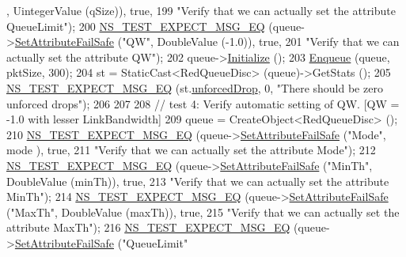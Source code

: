 \begin{DoxyCode}
      , UintegerValue (qSize)), \textcolor{keyword}{true},
199                          \textcolor{stringliteral}{"Verify that we can actually set the attribute QueueLimit"});
200   \hyperlink{group__testing_ga7304ba46a28d8cf08dfdfd6499cf7068}{NS\_TEST\_EXPECT\_MSG\_EQ} (queue->\hyperlink{classns3_1_1ObjectBase_aa7d333004e970f925a4ed5df275541b5}{SetAttributeFailSafe} (\textcolor{stringliteral}{"QW"}, 
      DoubleValue (-1.0)), \textcolor{keyword}{true},
201                          \textcolor{stringliteral}{"Verify that we can actually set the attribute QW"});
202   queue->\hyperlink{classns3_1_1Object_af4411cb29971772fcd09203474a95078}{Initialize} ();
203   \hyperlink{classAredQueueDiscTestCase_a5528c44233e1056913e76d5be988f049}{Enqueue} (queue, pktSize, 300);
204   st = StaticCast<RedQueueDisc> (queue)->GetStats ();
205   \hyperlink{group__testing_ga7304ba46a28d8cf08dfdfd6499cf7068}{NS\_TEST\_EXPECT\_MSG\_EQ} (st.\hyperlink{structns3_1_1RedQueueDisc_1_1Stats_a242027f6eb7d30e2cd636c52080e2c73}{unforcedDrop}, 0, \textcolor{stringliteral}{"There should be zero
       unforced drops"});
206 
207 
208   \textcolor{comment}{// test 4: Verify automatic setting of QW. [QW = -1.0 with lesser LinkBandwidth]}
209   queue = CreateObject<RedQueueDisc> ();
210   \hyperlink{group__testing_ga7304ba46a28d8cf08dfdfd6499cf7068}{NS\_TEST\_EXPECT\_MSG\_EQ} (queue->\hyperlink{classns3_1_1ObjectBase_aa7d333004e970f925a4ed5df275541b5}{SetAttributeFailSafe} (\textcolor{stringliteral}{"Mode"}, mode
      ), \textcolor{keyword}{true},
211                          \textcolor{stringliteral}{"Verify that we can actually set the attribute Mode"});
212   \hyperlink{group__testing_ga7304ba46a28d8cf08dfdfd6499cf7068}{NS\_TEST\_EXPECT\_MSG\_EQ} (queue->\hyperlink{classns3_1_1ObjectBase_aa7d333004e970f925a4ed5df275541b5}{SetAttributeFailSafe} (\textcolor{stringliteral}{"MinTh"}, 
      DoubleValue (minTh)), \textcolor{keyword}{true},
213                          \textcolor{stringliteral}{"Verify that we can actually set the attribute MinTh"});
214   \hyperlink{group__testing_ga7304ba46a28d8cf08dfdfd6499cf7068}{NS\_TEST\_EXPECT\_MSG\_EQ} (queue->\hyperlink{classns3_1_1ObjectBase_aa7d333004e970f925a4ed5df275541b5}{SetAttributeFailSafe} (\textcolor{stringliteral}{"MaxTh"}, 
      DoubleValue (maxTh)), \textcolor{keyword}{true},
215                          \textcolor{stringliteral}{"Verify that we can actually set the attribute MaxTh"});
216   \hyperlink{group__testing_ga7304ba46a28d8cf08dfdfd6499cf7068}{NS\_TEST\_EXPECT\_MSG\_EQ} (queue->\hyperlink{classns3_1_1ObjectBase_aa7d333004e970f925a4ed5df275541b5}{SetAttributeFailSafe} (\textcolor{stringliteral}{"QueueLimit"}

\end{DoxyCode}
